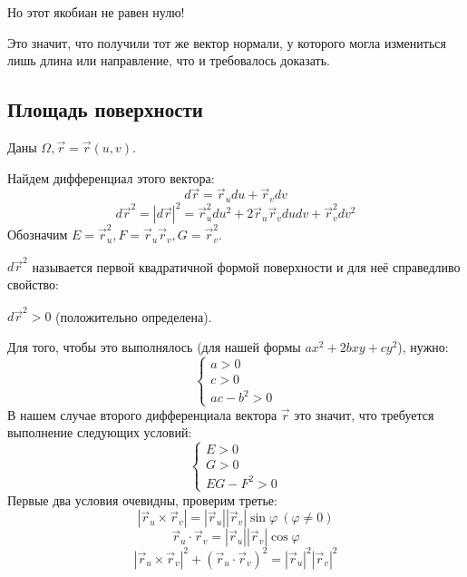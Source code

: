 \documentclass[12pt]{article}
\begin{document}
Но этот якобиан не равен нулю!\par
Это значит, что получили тот же вектор нормали, у которого могла измениться лишь длина или направление, что и требовалось доказать.\par
\subsection{Площадь поверхности}
Даны $\Omega, \overrightarrow{r}=\overrightarrow{r}(u,v)$.\par
Найдем дифференциал этого вектора:
$$d \overrightarrow{r} = \overrightarrow{r}_u du + \overrightarrow{r}_v dv$$
$$d \overrightarrow{r}^2 = |d \overrightarrow{r}|^2 = \overrightarrow{r}_u^2 du^2 + 2 \overrightarrow{r}_u \overrightarrow{r}_v dudv + \overrightarrow{r}_v^2 dv^2$$
Обозначим $E = \overrightarrow{r}_u^2, F = \overrightarrow{r}_u \overrightarrow{r}_v, G = \overrightarrow{r}_v^2$.\par
$d \overrightarrow{r}^2$ называется первой квадратичной формой поверхности и для неё справедливо свойство:\par
$d \overrightarrow{r}^2 > 0$ (положительно определена).\par
Для того, чтобы это выполнялось (для нашей формы $ax^2 + 2bxy + cy^2$), нужно:
$$\begin{cases} a > 0 \\ c > 0 \\ ac - b^2 > 0 \end{cases}$$
В нашем случае второго дифференциала вектора $\overrightarrow{r}$ это значит, что требуется выполнение следующих условий:
$$\begin{cases} E > 0 \\ G > 0 \\ EG - F^2 > 0 \end{cases}$$
Первые два условия очевидны, проверим третье:
$$| \overrightarrow{r}_u \times \overrightarrow{r}_v | = |\overrightarrow{r}_u| |\overrightarrow{r}_v| \sin \varphi \  (\varphi \neq 0)$$
$$\overrightarrow{r}_u \cdot \overrightarrow{r}_v = |\overrightarrow{r}_u| |\overrightarrow{r}_v| \cos \varphi$$
$$|\overrightarrow{r}_u \times \overrightarrow{r}_v|^2 + (\overrightarrow{r}_u \cdot \overrightarrow{r}_v)^2 = |\overrightarrow{r}_u|^2 |\overrightarrow{r}_v|^2$$
\end{document}
